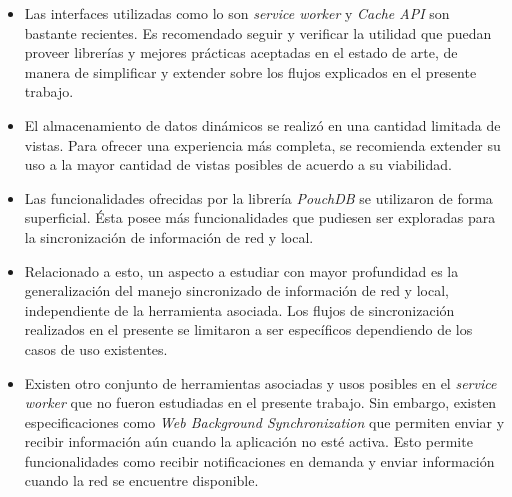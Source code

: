 \begin{itemize}

  \item Las interfaces utilizadas como lo son \textit{service worker} y \textit{Cache API} son bastante recientes. Es recomendado seguir y verificar la utilidad que puedan proveer librerías y mejores prácticas aceptadas en el estado de arte, de manera de simplificar y extender sobre los flujos explicados en el presente trabajo.

  \item El almacenamiento de datos dinámicos se realizó en una cantidad limitada de vistas. Para ofrecer una experiencia más completa, se recomienda extender su uso a la mayor cantidad de vistas posibles de acuerdo a su viabilidad.

  \item Las funcionalidades ofrecidas por la librería \textit{PouchDB} se utilizaron de forma superficial. Ésta posee más funcionalidades que pudiesen ser exploradas para la sincronización de información de red y local.

  \item Relacionado a esto, un aspecto a estudiar con mayor profundidad es la generalización del manejo sincronizado de información de red y local, independiente de la herramienta asociada. Los flujos de sincronización realizados en el presente se limitaron a ser específicos dependiendo de los casos de uso existentes.

  \item Existen otro conjunto de herramientas asociadas y usos posibles en el \textit{service worker} que no fueron estudiadas en el presente trabajo. Sin embargo, existen especificaciones como \textit{Web Background Synchronization} que permiten enviar y recibir información aún cuando la aplicación no esté activa. Esto permite funcionalidades como recibir notificaciones en demanda y enviar información cuando la red se encuentre disponible.

\end{itemize}

\newpage
